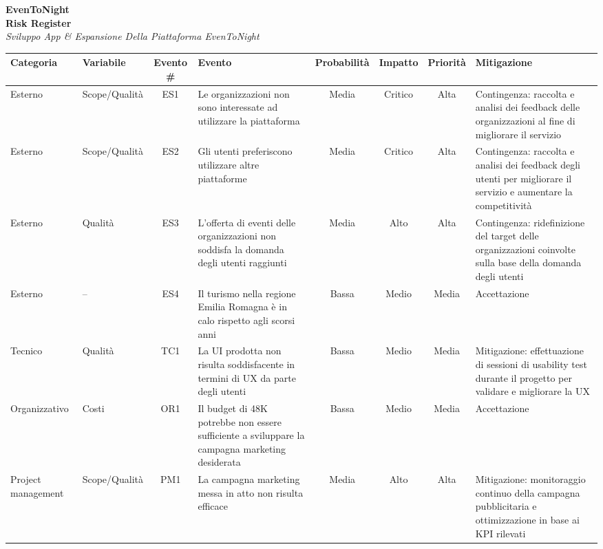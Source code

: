 \documentclass[11pt,a4paper]{article}
\newcommand{\allegatohead}[1]{%
  \begin{center}
    {\color{brand}\Huge\bfseries EvenToNight}\\[8pt]
    {\color{doclink}\LARGE\bfseries #1}\\[6pt]
    {\color{subt}\large\itshape Sviluppo App \& Espansione Della Piattaforma EvenToNight}
  \end{center}
  \vspace{1em}
}
\begin{document}
{}

\clearpage
{}\label{sec:risk}
\begin{landscape}
\setlength{\textwidth}{24cm}\setlength{\linewidth}{24cm}
\allegatohead{Risk Register}
\footnotesize
{}
\renewcommand{\arraystretch}{1.25}
\setlength{\tabcolsep}{4pt}
\noindent\begin{tabular}{|p{2.2cm}|p{2.0cm}|c|p{6.0cm}|c|c|c|p{6.5cm}|}
\hline
\rowcolor{brandbg}\textbf{Categoria} & \textbf{Variabile} & \textbf{Evento \#} & \textbf{Evento} & \textbf{Probabilità} & \textbf{Impatto} & \textbf{Priorità} & \textbf{Mitigazione} \\\hline
Esterno & Scope/Qualità & ES1 & Le organizzazioni non sono interessate ad utilizzare la piattaforma & Media & Critico & Alta & Contingenza: raccolta e analisi dei feedback delle organizzazioni al fine di migliorare il servizio \\\hline
Esterno & Scope/Qualità & ES2 & Gli utenti preferiscono utilizzare altre piattaforme & Media & Critico & Alta & Contingenza: raccolta e analisi dei feedback degli utenti per migliorare il servizio e aumentare la competitività \\\hline
Esterno & Qualità & ES3 & L’offerta di eventi delle organizzazioni non soddisfa la domanda degli utenti raggiunti & Media & Alto & Alta & Contingenza: ridefinizione del target delle organizzazioni coinvolte sulla base della domanda degli utenti \\\hline
Esterno & -- & ES4 & Il turismo nella regione Emilia Romagna è in calo rispetto agli scorsi anni & Bassa & Medio & Media & Accettazione \\\hline
Tecnico & Qualità & TC1 & La UI prodotta non risulta soddisfacente in termini di UX da parte degli utenti & Bassa & Medio & Media & Mitigazione: effettuazione di sessioni di usability test durante il progetto per validare e migliorare la UX \\\hline
Organizzativo & Costi & OR1 & Il budget di 48K potrebbe non essere sufficiente a sviluppare la campagna marketing desiderata & Bassa & Medio & Media & Accettazione \\\hline
Project management & Scope/Qualità & PM1 & La campagna marketing messa in atto non risulta efficace & Media & Alto & Alta & Mitigazione: monitoraggio continuo della campagna pubblicitaria e ottimizzazione in base ai KPI rilevati \\\hline

\end{tabular}
\end{landscape}
\end{document}
